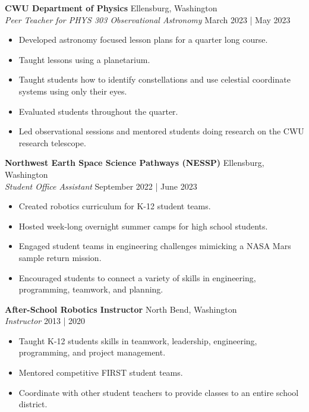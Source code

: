 \documentclass[a4paper,9pt]{extarticle}
\begin{document}
\noindent\textbf{CWU Department of Physics} \hfill Ellensburg, Washington\\
\textit{Peer Teacher for PHYS 303 Observational Astronomy} \hfill March 2023 | May 2023
\begin{itemize}
    \item Developed astronomy focused lesson plans for a quarter long course.
    \item Taught lessons using a planetarium.
    \item Taught students how to identify constellations and use celestial coordinate systems using only their eyes.
    \item Evaluated students throughout the quarter.
    \item Led observational sessions and mentored students doing research on the CWU research telescope.
\end{itemize}

\noindent\textbf{Northwest Earth Space Science Pathways (NESSP)} \hfill Ellensburg, Washington\\
\textit{Student Office Assistant} \hfill September 2022 | June 2023
\begin{itemize}
    \item Created robotics curriculum for K-12 student teams.
    \item Hosted week-long overnight summer camps for high school students.
    \item Engaged student teams in engineering challenges mimicking a NASA Mars sample return mission.
    \item Encouraged students to connect a variety of skills in engineering, programming, teamwork, and planning.
\end{itemize}

\noindent\textbf{After-School Robotics Instructor} \hfill North Bend, Washington\\
\textit{Instructor} \hfill 2013 | 2020
\begin{itemize}
    \item Taught K-12 students skills in teamwork, leadership, engineering, programming, and project management.
    \item Mentored competitive FIRST student teams.
    \item Coordinate with other student teachers to provide classes to an entire school district.
\end{itemize}
\end{document}
